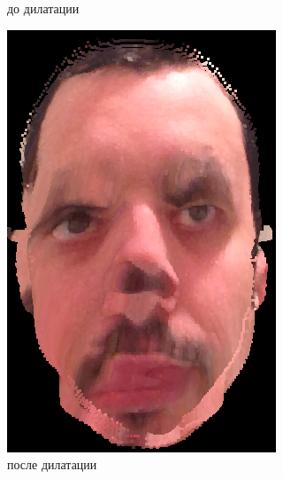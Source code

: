 \begin{figure}[t]
\begin{subfigure}[t]{0.3\textwidth}
		\caption{до дилатации}
	\end{subfigure}
	\begin{subfigure}[t]{0.3\textwidth}
		\includegraphics[width=\textwidth]{bad_model_dilatation.png}
		\caption{после дилатации}
	\end{subfigure}
	\begin{subfigure}[t]{0.3\textwidth}

\end{subfigure}
\end{figure}
